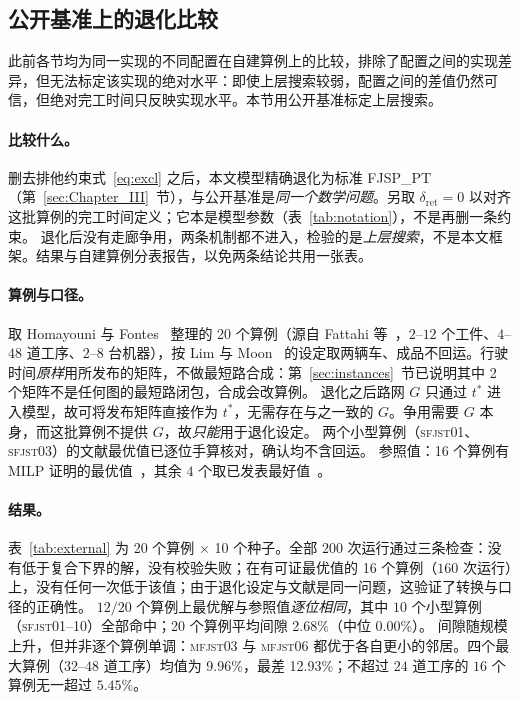 \documentclass[manuscript,screen,review]{acmart}
\newcommand{\NSeeds}{10}
\newcommand{\PubNInst}{20}
\newcommand{\PubNOpt}{16}                 %
\newcommand{\PubNMatch}{12}               %
\newcommand{\PubGapMean}{2.68\%}          %
\newcommand{\PubGapMed}{0.00\%}
\newcommand{\PubGapMax}{12.93\%}
\newcommand{\PubGapBig}{9.96\%}           %
\newcommand{\PubNLayoutBad}{2}            %
\begin{document}
\subsection{公开基准上的退化比较}
\label{sec:external}

此前各节均为同一实现的不同配置在自建算例上的比较，排除了配置之间的实现差异，但无法标定该实现的绝对水平：即使上层搜索较弱，配置之间的差值仍然可信，但绝对完工时间只反映实现水平。本节用公开基准标定上层搜索。

\paragraph{比较什么。}
删去排他约束式~\eqref{eq:excl} 之后，本文模型精确退化为标准 FJSP\_PT（第~\ref{sec:Chapter_III}~节），与公开基准是\emph{同一个数学问题}。另取 $\delta_{\mathrm{ret}}=0$ 以对齐这批算例的完工时间定义；它本是模型参数（表~\ref{tab:notation}），不是再删一条约束。
退化后没有走廊争用，两条机制都不进入，检验的是\emph{上层搜索}，不是本文框架。结果与自建算例分表报告，以免两条结论共用一张表。

\paragraph{算例与口径。}
取 Homayouni 与 Fontes~\cite{homayouni2021production} 整理的 \PubNInst{} 个算例（源自 Fattahi 等~\cite{fattahi2007mathematical}，$2$--$12$ 个工件、$4$--$48$ 道工序、$2$--$8$ 台机器），按 Lim 与 Moon~\cite{lim2023twophase} 的设定取两辆车、成品不回运。行驶时间\emph{原样}用所发布的矩阵，不做最短路合成：第~\ref{sec:instances}~节已说明其中 \PubNLayoutBad{} 个矩阵不是任何图的最短路闭包，合成会改算例。
退化之后路网 $G$ 只通过 $t^{*}$ 进入模型，故可将发布矩阵直接作为 $t^{*}$，无需存在与之一致的 $G$。争用需要 $G$ 本身，而这批算例不提供 $G$，故\emph{只能}用于退化设定。
两个小型算例（\textsc{sfjst}01、\textsc{sfjst}03）的文献最优值已逐位手算核对，确认均不含回运。
参照值：\PubNOpt{} 个算例有 MILP 证明的最优值~\cite{homayouni2021production}，其余 $4$ 个取已发表最好值~\cite{lim2023twophase}。

\paragraph{结果。}
表~\ref{tab:external} 为 \PubNInst{} 个算例 $\times$ \NSeeds{} 个种子。全部 $200$ 次运行通过三条检查：没有低于复合下界的解，没有校验失败；在有可证最优值的 \PubNOpt{} 个算例（$160$ 次运行）上，没有任何一次低于该值；由于退化设定与文献是同一问题，这验证了转换与口径的正确性。
$\PubNMatch{}/\PubNInst{}$ 个算例上最优解与参照值\emph{逐位相同}，其中 $10$ 个小型算例（\textsc{sfjst}01--10）全部命中；\PubNInst{} 个算例平均间隙 \PubGapMean{}（中位 \PubGapMed{}）。
间隙随规模上升，但并非逐个算例单调：\textsc{mfjst}03 与 \textsc{mfjst}06 都优于各自更小的邻居。四个最大算例（$32$--$48$ 道工序）均值为 \PubGapBig{}，最差 \PubGapMax{}；不超过 $24$ 道工序的 $16$ 个算例无一超过 $5.45\%$。
\end{document}
